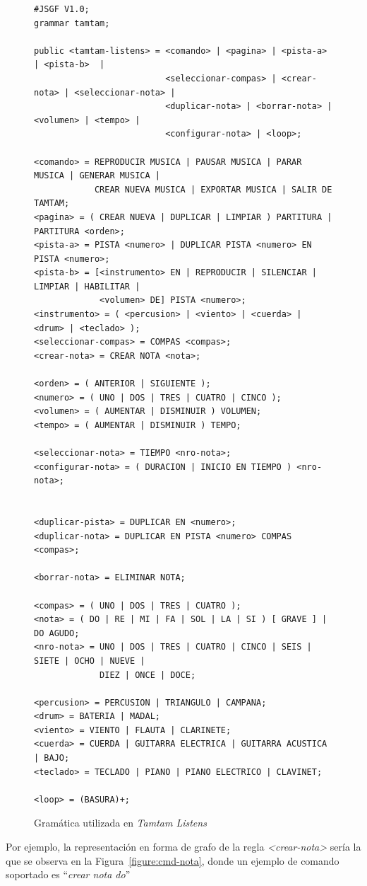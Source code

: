 \begin{figure}[H]
\begin{lstlisting}
#JSGF V1.0;
grammar tamtam;

public <tamtam-listens> = <comando> | <pagina> | <pista-a>  | <pista-b>  | 
                          <seleccionar-compas> | <crear-nota> | <seleccionar-nota> | 
                          <duplicar-nota> | <borrar-nota> | <volumen> | <tempo> | 
                          <configurar-nota> | <loop>;

<comando> = REPRODUCIR MUSICA | PAUSAR MUSICA | PARAR MUSICA | GENERAR MUSICA | 
            CREAR NUEVA MUSICA | EXPORTAR MUSICA | SALIR DE TAMTAM;
<pagina> = ( CREAR NUEVA | DUPLICAR | LIMPIAR ) PARTITURA | PARTITURA <orden>;
<pista-a> = PISTA <numero> | DUPLICAR PISTA <numero> EN PISTA <numero>;
<pista-b> = [<instrumento> EN | REPRODUCIR | SILENCIAR | LIMPIAR | HABILITAR | 
             <volumen> DE] PISTA <numero>;
<instrumento> = ( <percusion> | <viento> | <cuerda> | <drum> | <teclado> );
<seleccionar-compas> = COMPAS <compas>;
<crear-nota> = CREAR NOTA <nota>;

<orden> = ( ANTERIOR | SIGUIENTE );
<numero> = ( UNO | DOS | TRES | CUATRO | CINCO );
<volumen> = ( AUMENTAR | DISMINUIR ) VOLUMEN;
<tempo> = ( AUMENTAR | DISMINUIR ) TEMPO;

<seleccionar-nota> = TIEMPO <nro-nota>;
<configurar-nota> = ( DURACION | INICIO EN TIEMPO ) <nro-nota>;


<duplicar-pista> = DUPLICAR EN <numero>;
<duplicar-nota> = DUPLICAR EN PISTA <numero> COMPAS <compas>;

<borrar-nota> = ELIMINAR NOTA;

<compas> = ( UNO | DOS | TRES | CUATRO );
<nota> = ( DO | RE | MI | FA | SOL | LA | SI ) [ GRAVE ] | DO AGUDO;
<nro-nota> = UNO | DOS | TRES | CUATRO | CINCO | SEIS | SIETE | OCHO | NUEVE | 
             DIEZ | ONCE | DOCE;

<percusion> = PERCUSION | TRIANGULO | CAMPANA;
<drum> = BATERIA | MADAL;
<viento> = VIENTO | FLAUTA | CLARINETE;
<cuerda> = CUERDA | GUITARRA ELECTRICA | GUITARRA ACUSTICA | BAJO;
<teclado> = TECLADO | PIANO | PIANO ELECTRICO | CLAVINET;

<loop> = (BASURA)+;
\end{lstlisting}
\caption{Gram\'atica utilizada en \emph{Tamtam Listens}}
\end{figure}

Por ejemplo, la representaci\'on en forma de grafo de la regla \emph{<crear-nota>} ser\'ia la que se
observa en la Figura~\ref{figure:cmd-nota}, donde un ejemplo de comando soportado es ``\emph{crear nota do}''

